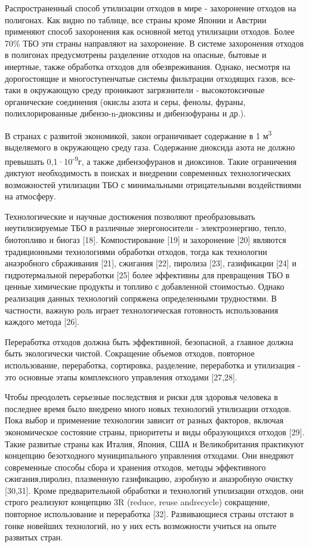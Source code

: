 Распространенный способ утилизации отходов в мире - захоронение отходов
на полигонах. Как видно по таблице, все страны кроме Японии и Австрии
применяют способ захоронения как основной метод утилизации отходов.
Более 70\% ТБО эти страны направляют на захоронение. В системе
захоронения отходов в полигонах предусмотрены разделение отходов на
опасные, бытовые и инертные, также обработка отходов для обезвреживания.
Однако, несмотря на дорогостоящие и многоступенчатые системы фильтрации
отходящих газов, все-таки в окружающую среду проникают загрязнители -
высокотоксичные органические соединения (окислы азота и серы, фенолы,
фураны, полихлорированные дибензо-n-диоксины и дибензофураны и др.).

В странах с развитой экономикой, закон ограничивает содержание в 1
м\textsuperscript{3} выделяемого в окружающею среду газа. Содержание
диоксида азота не должно превышать 0,1·10\textsuperscript{-9}г, а также
дибензофуранов и диоксинов. Такие ограничения диктуют необходимость в
поисках и внедрении современных технологических возможностей утилизации
ТБО с минимальными отрицательными воздействиями на атмосферу.

Технологические и научные достижения позволяют преобразовывать
неутилизируемые ТБО в различные энергоносители - электроэнергию, тепло,
биотопливо и биогаз {[}18{]}. Компостирование {[}19{]} и захоронение
{[}20{]} являются традиционными технологиями обработки отходов, тогда
как технологии анаэробного сбраживания {[}21{]}, сжигания {[}22{]},
пиролиза {[}23{]}, газификации {[}24{]} и гидротермальной переработки
{[}25{]} более эффективны для превращения ТБО в ценные химические
продукты и топливо с добавленной стоимостью. Однако реализация данных
технологий сопряжена определенными трудностями. В частности, важную роль
играет технологическая готовность использования каждого метода {[}26{]}.

Переработка отходов должна быть эффективной, безопасной, а главное
должна быть экологически чистой. Сокращение объемов отходов, повторное
использование, переработка, сортировка, разделение, переработка и
утилизация - это основные этапы комплексного управления отходами
{[}27,28{]}.

Чтобы преодолеть серьезные последствия и риски для здоровья человека в
последнее время было внедрено много новых технологий утилизации отходов.
Пока выбор и применение технологии зависит от разных факторов, включая
экономическое состояние страны, приоритеты и виды образующихся отходов
{[}29{]}. Такие развитые страны как Италия, Япония, США и Великобритания
практикуют концепцию безотходного муниципального управления отходами.
Они внедряют современные способы сбора и хранения отходов, методы
эффективного сжигания,пиролиз, плазменную газификацию, аэробную и
анаэробную очистку {[}30,31{]}. Кроме предварительной обработки и
технологий утилизации отходов, они строго реализуют концепцию 3R
(reduce, reuse andrecycle) сокращение, повторное использование и
переработка {[}32{]}. Развивающиеся страны отстают в гонке новейших
технологий, но у них есть возможности учиться на опыте развитых стран.

